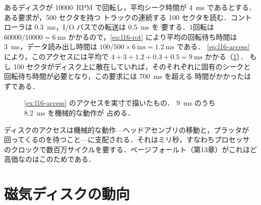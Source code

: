 \documentclass[../main.tex]{subfiles}
\begin{document}
\begin{example}
  \label{ex:l16-access}
  あるディスクが \num{10000}~RPM で回転し，平均シーク時間が
  \SI{4}{\milli\second} であるとする．ある要求が，500 セクタを持つ
  トラックの連続する 100 セクタを読む．コントローラは
  \SI{0.3}{\milli\second}，I/O バスでの転送は \SI{0.5}{\milli\second} を
  要する．1回転は $\num{60000}/\num{10000} = \SI{6}{\milli\second}$
  かかるので，\cref{eq:l16-rot} により平均の回転待ち時間は
  \SI{3}{\milli\second}，データ読み出し時間は $100/500 \times
  \SI{6}{\milli\second} = \SI{1.2}{\milli\second}$ である．
  \cref{eq:l16-access} により，このアクセスには平均で $4 + 3 + 1.2 + 0.3
  + 0.5 = \SI{9}{\milli\second}$ かかる（\cref{fig:l16-access-time}）．
  もし 100 セクタがディスク上に散在していれば，そのそれぞれに固有のシークと
  回転待ち時間が必要となり，この要求には \SI{700}{\milli\second} を超える
  時間がかかったはずである．
\end{example}

\begin{figure}[htbp]
  \centering
  
  \caption{\cref{ex:l16-access} のアクセスを実寸で描いたもの．
    \SI{9}{\milli\second} のうち \SI{8.2}{\milli\second} を機械的な動作が
    占める．}
  \label{fig:l16-access-time}
\end{figure}


\begin{keypoint}
  ディスクのアクセスは機械的な動作---ヘッドアセンブリの移動と，プラッタが
  回ってくるのを待つこと---に支配される．それはミリ秒，すなわちプロセッサ
  のクロックで数百万サイクルを要する．ページフォールト（第13章）がこれほど
  高価なのはこのためである．
\end{keypoint}

\section{磁気ディスクの動向}
\label{sec:l16-trends}
\end{document}
